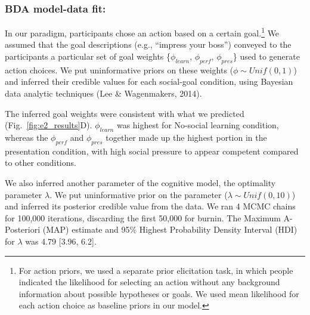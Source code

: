 \documentclass[10pt, letterpaper]{article}
\begin{document}
\subsubsection{BDA model-data fit:}\label{bda-model-data-fit}

In our paradigm, participants chose an action based on a certain
goal.\footnote{For action priors, we used a separate prior elicitation task, in which people indicated the likelihood for selecting an action without any background information about possible hypotheses or goals. We used mean likelihood for each action choice as baseline priors in our model.}
We assumed that the goal descriptions (e.g., ``impress your boss'')
conveyed to the participants a particular set of goal weights
\{\(\phi_{learn}\), \(\phi_{perf}\), \(\phi_{pres}\)\} used to generate
action choices. We put uninformative priors on these weights
(\(\phi \sim Unif(0,1)\)) and inferred their credible values for each
social-goal condition, using Bayesian data analytic techniques (Lee \&
Wagenmakers, 2014).

The inferred goal weights were consistent with what we predicted
(Fig.~\ref{fig:e2_results}D). \(\phi_{learn}\) was highest for No-social
learning condition, whereas the \(\phi_{perf}\) and \(\phi_{pres}\)
together made up the highest portion in the presentation condition, with
high social pressure to appear competent compared to other conditions.

We also inferred another parameter of the cognitive model, the
optimality parameter \(\lambda\). We put uninformative prior on the
parameter (\(\lambda \sim Unif(0,10)\)) and inferred its posterior
credible value from the data. We ran 4 MCMC chains for 100,000
iterations, discarding the first 50,000 for burnin. The Maximum A-
Posteriori (MAP) estimate and 95\% Highest Probability Density Interval
(HDI) for \(\lambda\) was 4.79 {[}3.96, 6.2{]}.
\end{document}
